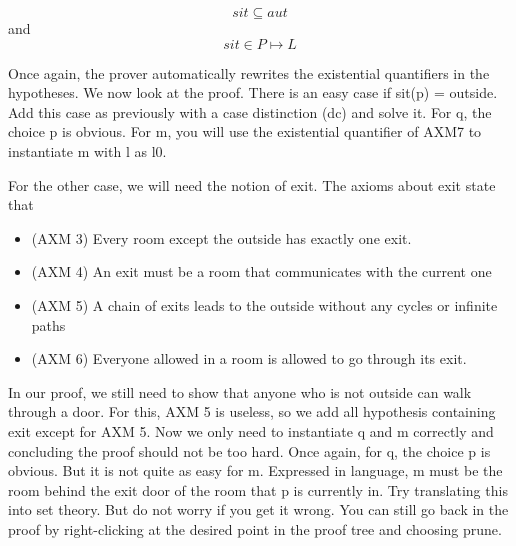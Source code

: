 \[
sit \subseteq aut
\]
and
\[
sit \in P \mapsto L
\]

Once again, the prover automatically rewrites the existential quantifiers in the hypotheses. We now look at the proof. There is an easy case if sit(p) = outside. Add this case as previously with a case distinction (dc) and solve it. For q, the choice p is obvious. For m, you will use the existential quantifier of AXM7 to instantiate m with l as l0. 

For the other case, we will need the notion of exit. The axioms about exit state that 

\begin{itemize}
	\item (AXM 3) Every room except the outside has exactly one exit. 
	\item (AXM 4) An exit must be a room that communicates with the current one
	\item (AXM 5) A chain of exits leads to the outside without any cycles or infinite paths
	\item (AXM 6) Everyone allowed in a room is allowed to go through its exit. 
\end{itemize}  

In our proof, we still need to show that anyone who is not outside can walk through a door. For this, AXM 5 is useless, so we add all hypothesis containing exit except for AXM 5. Now we only need to instantiate q and m correctly and concluding the proof should not be too hard. Once again, for q, the choice p is obvious. But it is not quite as easy for m. Expressed in language, m must be the room behind the exit door of the room that p is currently in. Try translating this into set theory. But do not worry if you get it wrong. You can still go back in the proof by right-clicking at the desired point in the proof tree and choosing prune.

